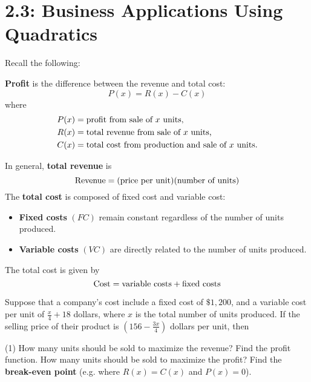 \documentclass[../mathNotesPreamble]{subfiles}
\providecommand{\relscalefact}{1.4}
\begin{document}
\relscale{\relscalefact}
  \section{2.3: Business Applications Using Quadratics}
  Recall the following:
  \begin{defn*}
    \textbf{Profit} is the difference between the revenue and total cost:
      \[P(x)=R(x)-C(x)\]
    where
      \begin{align*}
        P(x)&= \textnormal{profit from sale of $x$ units,}\\
        R(x)&= \textnormal{total revenue from sale of $x$ units,}\\
        C(x)&= \textnormal{total cost from production and sale of $x$ units.}
      \end{align*}

    \vspace*{\baselineskip}
    In general, \textbf{total revenue} is
      \[\textnormal{Revenue}={\left(\textnormal{price per unit}\right)}{\left(\textnormal{number of units}\right)}\]
    The \textbf{total cost} is composed of fixed cost and variable cost:
    \begin{itemize}
      \item \textbf{Fixed costs} $(FC)$ remain constant regardless of the number of units produced.
      \item \textbf{Variable costs} $(VC)$ are directly related to the number of units produced.
    \end{itemize}
    The total cost is given by
      \[\textnormal{Cost}=\textnormal{variable costs}+\textnormal{fixed costs}\]
  \end{defn*}
  \pagebreak

  \begin{ex*}
    Suppose that a company's cost include a fixed cost of $\$1,200$, and a variable cost per unit of $\frac{x}{4}+18$ dollars, where $x$ is the total number of units produced. If the selling price of their product is $(156-\frac{3x}{4})$ dollars per unit, then
  \end{ex*}
  \begin{extasks}[after-item-skip=\stretch{1}](1)
    \task How many units should be sold to maximize the revenue?
    \task Find the profit function.
    \task How many units should be sold to maximize the profit?
    \task Find the \textbf{break-even point} (e.g. where $R(x)=C(x)$ and $P(x)=0$).
  \end{extasks}
\end{document}
